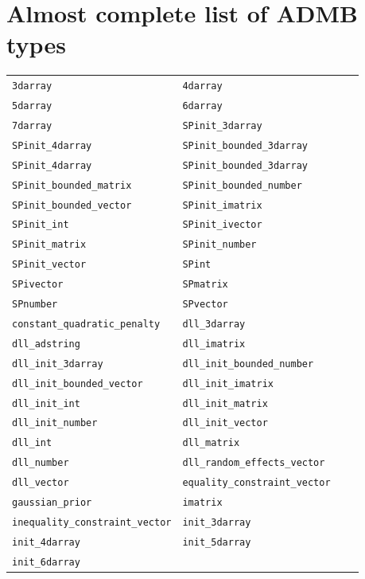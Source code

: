 \documentclass[a4paper,10pt,notumble]{leaflet}
\begin{document}

\section{Almost complete list of ADMB types}
{\scriptsize
\begin{center}
\begin{tabular}{@{}llll@{}}
\verb+3darray+&
\verb+4darray+\\
\verb+5darray+&
\verb+6darray+\\
\verb+7darray+&
\verb+SPinit_3darray+\\
\verb+SPinit_4darray+&
\verb+SPinit_bounded_3darray+\\
\verb+SPinit_4darray+&
\verb+SPinit_bounded_3darray+\\
\verb+SPinit_bounded_matrix+&
\verb+SPinit_bounded_number+\\
\verb+SPinit_bounded_vector+&
\verb+SPinit_imatrix+\\
\verb+SPinit_int+&
\verb+SPinit_ivector+\\
\verb+SPinit_matrix+&
\verb+SPinit_number+\\
\verb+SPinit_vector+&
\verb+SPint+\\
\verb+SPivector+&
\verb+SPmatrix+\\
\verb+SPnumber+&
\verb+SPvector+\\
\verb+constant_quadratic_penalty+&
\verb+dll_3darray+\\
\verb+dll_adstring+&
\verb+dll_imatrix+\\
\verb+dll_init_3darray+&
\verb+dll_init_bounded_number+\\
\verb+dll_init_bounded_vector+&
\verb+dll_init_imatrix+\\
\verb+dll_init_int+&
\verb+dll_init_matrix+\\
\verb+dll_init_number+&
\verb+dll_init_vector+\\
\verb+dll_int+&
\verb+dll_matrix+\\
\verb+dll_number+&
\verb+dll_random_effects_vector+\\
\verb+dll_vector+&
\verb+equality_constraint_vector+\\
\verb+gaussian_prior+&
\verb+imatrix+\\
\verb+inequality_constraint_vector+&
\verb+init_3darray+\\
\verb+init_4darray+&
\verb+init_5darray+\\
\verb+init_6darray+&

\end{tabular}
\end{center}}
\end{document}
